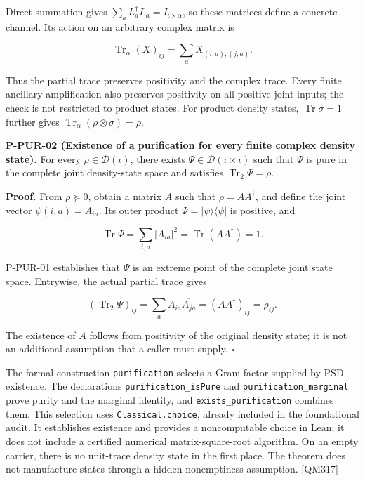 \documentclass[
  11pt,
  oneside]{book}
\begin{document}
Direct summation gives \(\sum_aL_a^\dagger L_a=I_{\iota\times\alpha}\),
so these matrices define a concrete channel. Its action on an arbitrary
complex matrix is

\[
\operatorname{Tr}_{\alpha}(X)_{ij}
=\sum_aX_{(i,a),(j,a)}.
\]

Thus the partial trace preserves positivity and the complex trace. Every
finite ancillary amplification also preserves positivity on all positive
joint inputs; the check is not restricted to product states. For product
density states, \(\operatorname{Tr}\sigma=1\) further gives
\(\operatorname{Tr}_{\alpha}(\rho\otimes\sigma)=\rho\).

\label{p-pur-02}{}

\textbf{P-PUR-02 (Existence of a purification for every finite complex
density state).} For every \(\rho\in\mathcal D(\iota)\), there exists
\(\Psi\in\mathcal D(\iota\times\iota)\) such that \(\Psi\) is pure in
the complete joint density-state space and satisfies
\(\operatorname{Tr}_{2}\Psi=\rho\).

\textbf{Proof.} From \(\rho\succeq0\), obtain a matrix \(A\) such that
\(\rho=AA^\dagger\), and define the joint vector \(\psi(i,a)=A_{ia}\).
Its outer product \(\Psi=|\psi\rangle\langle\psi|\) is positive, and

\[
\operatorname{Tr}\Psi
=\sum_{i,a}|A_{ia}|^2
=\operatorname{Tr}(AA^\dagger)=1.
\]

P-PUR-01 establishes that \(\Psi\) is an extreme point of the complete
joint state space. Entrywise, the actual partial trace gives

\[
(\operatorname{Tr}_{2}\Psi)_{ij}
=\sum_a A_{ia}\overline{A_{ja}}
=(AA^\dagger)_{ij}=\rho_{ij}.
\]

The existence of \(A\) follows from positivity of the original density
state; it is not an additional assumption that a caller must supply.
\(\square\)

The formal construction \texttt{purification} selects a Gram factor
supplied by PSD existence. The declarations
\texttt{purification\_\allowbreak is\allowbreak Pure} and \texttt{purification\_\allowbreak marginal} prove
purity and the marginal identity, and \texttt{exists\_\allowbreak purification}
combines them. This selection uses \texttt{Classical.\allowbreak choice}, already
included in the foundational audit. It establishes existence and
provides a noncomputable choice in Lean; it does not include a certified
numerical matrix-square-root algorithm. On an empty carrier, there is no
unit-trace density state in the first place. The theorem does not
manufacture states through a hidden nonemptiness assumption. {[}QM317{]}
\end{document}
